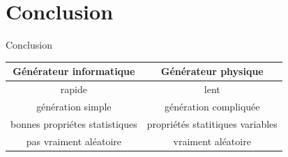 \documentclass[aspectratio=43]{beamer}
\begin{document}
\section{Conclusion}
    \begin{frame}
        \begin{center}
            \Huge
            Conclusion
        \end{center}
    \end{frame}
    \begin{frame}
\begin{center}
        \begin{tabular}{c|c}
            \textbf{Générateur informatique} & \textbf{Générateur physique}\\
            \hline
            rapide& lent\\
            génération simple & génération compliquée\\
            bonnes propriétes statistiques & propriétés statitiques variables \\
            \hline
            pas vraiment aléatoire & vraiment aléatoire
        \end{tabular}
    \end{center}
    \end{frame}
\appendix
{}

\end{document}
